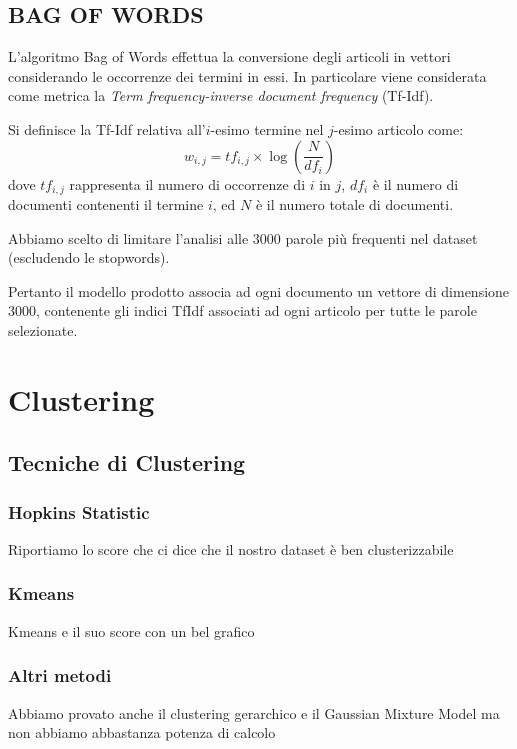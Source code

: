 \documentclass[
	12pt, %
	a4paper, %
	oneside, %
	headinclude,footinclude, %
	BCOR5mm, %
]{scrartcl}
\begin{document}
	\subsection{BAG OF WORDS}

	L'algoritmo Bag of Words\cite{bagofwords} effettua la conversione degli articoli in vettori considerando le occorrenze dei termini in essi.
	In particolare viene considerata come metrica la \textit{Term frequency-inverse document frequency} (Tf-Idf).
	
	Si definisce la Tf-Idf relativa all'$i$-esimo termine nel $j$-esimo articolo come:
	$$
	w_{i,j}=tf_{i,j}\times\log(\frac{N}{df_{i}})
	$$
	dove $tf_{i,j}$ rappresenta il numero di occorrenze di $i$ in $j$, $df_{i}$ è il numero di documenti contenenti il termine $i$, ed $N$ è il numero totale di documenti.
	
	Abbiamo scelto di limitare l'analisi alle 3000 parole pi\`{u} frequenti nel dataset (escludendo le stopwords).
	
	Pertanto il modello prodotto associa ad ogni documento un vettore di dimensione 3000, contenente gli indici TfIdf associati ad ogni articolo per tutte le parole selezionate.
	


\section{Clustering}

	\subsection{Tecniche di Clustering}

		\subsubsection{Hopkins Statistic}
			Riportiamo lo score che ci dice che il nostro dataset è ben clusterizzabile

		\subsubsection{Kmeans}
			Kmeans e il suo score con un bel grafico

		\subsubsection{Altri metodi}

			Abbiamo provato anche il clustering gerarchico e il Gaussian Mixture Model
			ma non abbiamo abbastanza potenza di calcolo
\end{document}
